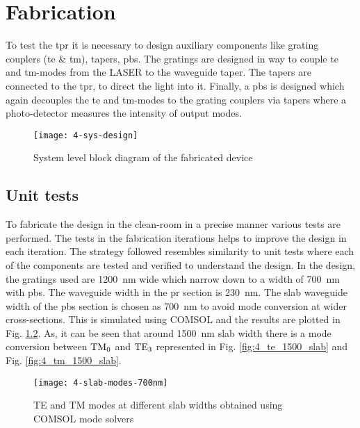 \documentclass[../report.tex]{subfiles}
\begin{document}
	
	
\chapter{Fabrication}
To test the \gls{tpr} it is necessary to design auxiliary components like grating couplers (\gls{te} \& \gls{tm}), tapers, \gls{pbs}. The gratings are designed in way to couple \gls{te} and \gls{tm}-modes from the LASER to the waveguide taper. The tapers are connected to the \gls{tpr}, to direct the light into it. Finally, a \gls{pbs} is designed which again decouples the \gls{te} and \gls{tm}-modes to the grating couplers via tapers where a photo-detector measures the intensity of output modes.  

\begin{figure}[H] %
	\centering
	\texttt{[image: 4-sys-design]}
	\caption{System level block diagram of the fabricated device}
	\label{fig:4_sys_design}
\end{figure}

\section{Unit tests}
To fabricate the design in the clean-room in a precise manner various tests are performed. The tests in the fabrication iterations helps to improve the design in each iteration. The strategy followed resembles similarity to unit tests where each of the components are tested and verified to understand the design. In the design, the gratings used are \SI{1200}{\nano\meter} wide which narrow down to a width of \SI{700}{\nano\meter} with \gls{pbs}. The waveguide width in the \gls{pr} section is \SI{230}{\nano\meter}. The slab waveguide width of the \gls{pbs} section is chosen as \SI{700}{\nano\meter} to avoid mode conversion at wider cross-sections. This is simulated using COMSOL and the results are plotted in Fig. \ref{fig:4_slab_modes_700nm}. As, it can be seen that around \SI{1500}{\nano\meter} slab width there is a mode conversion between $\mathrm{TM_0}$ and $\mathrm{TE_3}$ represented in Fig. \ref{fig:4_te_1500_slab} and Fig. \ref{fig:4_tm_1500_slab}. 

\begin{figure}[H] %
	\centering
	\texttt{[image: 4-slab-modes-700nm]}
	\caption{TE and TM modes at different slab widths obtained using COMSOL mode solvers}
	\label{fig:4_slab_modes_700nm}
\end{figure}
\end{document}
